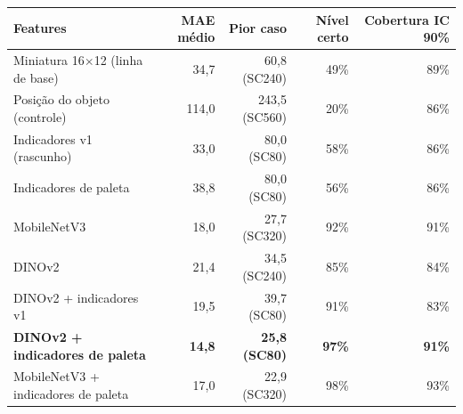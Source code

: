 \begin{tabular}{lrrrr}
\toprule
Features & MAE médio & Pior caso & Nível certo & Cobertura IC 90\% \\
\midrule
Miniatura 16$\times$12 (linha de base) & 34,7 & 60,8 (SC240) & 49\% & 89\% \\
Posição do objeto (controle) & 114,0 & 243,5 (SC560) & 20\% & 86\% \\
Indicadores v1 (rascunho) & 33,0 & 80,0 (SC80) & 58\% & 86\% \\
Indicadores de paleta & 38,8 & 80,0 (SC80) & 56\% & 86\% \\
MobileNetV3 & 18,0 & 27,7 (SC320) & 92\% & 91\% \\
DINOv2 & 21,4 & 34,5 (SC240) & 85\% & 84\% \\
DINOv2 + indicadores v1 & 19,5 & 39,7 (SC80) & 91\% & 83\% \\
\textbf{DINOv2 + indicadores de paleta} & \textbf{14,8} & \textbf{25,8 (SC80)} & \textbf{97\%} & \textbf{91\%} \\
MobileNetV3 + indicadores de paleta & 17,0 & 22,9 (SC320) & 98\% & 93\% \\
\bottomrule
\end{tabular}
